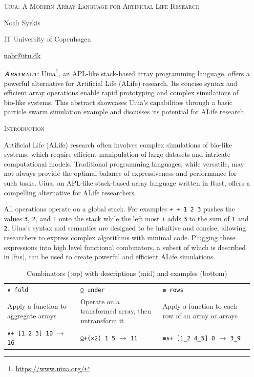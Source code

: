 {\textsc{Uiua: A Modern Array Language for Artificial Life Research}}

Noah Syrkis

IT University of Copenhagen

\url{nobr@itu.dk}

\emph{\textsc{\textbf{Abstract}}:} Uiua\footnote{\url{https://www.uiua.org/}},
an APL-like stack-based array programming language, offers a powerful
alternative for Artificial Life (ALife) research. Its concise syntax and
efficient array operations enable rapid prototyping and complex
simulations of bio-like systems. This abstract showcases Uiua's
capabilities through a basic particle swarm simulation example and
discusses its potential for ALife research.

\textsc{Introduction}

Artificial Life (ALife) research often involves complex simulations of
bio-like systems, which require efficient manipulation of large datasets
and intricate computational models. Traditional programming languages,
while versatile, may not always provide the optimal balance of
expressiveness and performance for such tasks. Uiua, an APL-like
stack-based array language written in Rust, offers a compelling
alternative for ALife researchers.

All operations operate on a global stack. For examples
\texttt{+\ +\ 1\ 2\ 3} pushes the values \texttt{3}, \texttt{2}, and
\texttt{1} onto the stack while the left most \texttt{+} adds \texttt{3}
to the sum of \texttt{1} and \texttt{2}. Uiua's syntax and semantics are
designed to be intuitive and concise, allowing researchers to express
complex algorithms with minimal code. Plugging these expressions into
high level functional combinators, a subset of which is described in
\hyperref[fns]{{[}fns{]}}, can be used to create powerful and efficient
ALife simulations.

\begin{longtable}[]{@{}
  >{\centering\arraybackslash}p{}
  >{\centering\arraybackslash}p{}
  >{\centering\arraybackslash}p{}@{}}
\caption{Combinators (top) with descriptions (mid) and examples
(bottom)}\tabularnewline
\toprule\noalign{}
\endfirsthead
\endhead
\bottomrule\noalign{}
\endlastfoot
\texttt{∧\ fold} & \texttt{⍜\ under} & \texttt{≡\ rows} \\
Apply a function to aggregate arrays & Operate on a transformed array,
then untransform it & Apply a function to each row of an array or
arrays \\
\texttt{∧+\ {[}1\ 2\ 3{]}\ 10} \(\rightarrow\) \texttt{16} &
\texttt{⍜+(×2)\ 1\ 5} \(\rightarrow\) \texttt{11} &
\texttt{≡∧+\ {[}1\_2\ 4\_5{]}\ 0} \(\rightarrow\) \texttt{3\_9} \\
\end{longtable}

